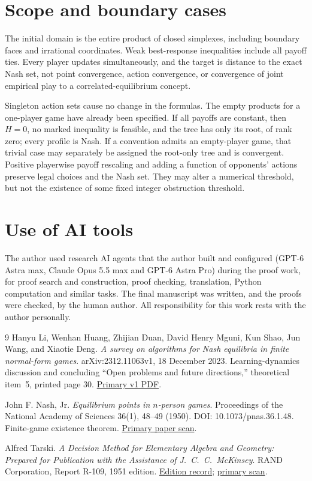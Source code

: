 \documentclass[11pt,a4paper]{article}
\theoremstyle{definition}
\begin{document}
\section{Scope and boundary cases}

The initial domain is the entire product of closed simplexes, including
boundary faces and irrational coordinates. Weak best-response inequalities
include all payoff ties. Every player updates simultaneously, and the
target is distance to the exact Nash set, not point convergence, action
convergence, or convergence of joint empirical play to a
correlated-equilibrium concept.

Singleton action sets cause no change in the formulas. The empty products
for a one-player game have already been specified. If all payoffs are
constant, then $H=0$, no marked inequality is feasible, and the tree has
only its root, of rank zero; every profile is Nash. If a convention admits
an empty-player game, that trivial case may separately be assigned the
root-only tree and is convergent. Positive playerwise payoff rescaling and
adding a function of opponents' actions preserve legal choices and the
Nash set. They may alter a numerical threshold, but not the existence of
some fixed integer obstruction threshold.

\section*{Use of AI tools}
The author used research AI agents that the author built and configured (GPT-6 Astra max,
Claude Opus 5.5 max and GPT-6 Astra Pro) during the proof work, for proof search and
construction, proof checking, translation, Python computation and similar tasks. The final
manuscript was written, and the proofs were checked, by the human author. All responsibility
for this work rests with the author personally.

\begin{thebibliography}{9}
Hanyu Li, Wenhan Huang, Zhijian Duan, David Henry Mguni, Kun Shao,
Jun Wang, and Xiaotie Deng.
\emph{A survey on algorithms for Nash equilibria in finite normal-form
games}. arXiv:2312.11063v1, 18 December 2023.
Learning-dynamics discussion and concluding ``Open problems and future
directions,'' theoretical item~5, printed page 30.
\href{https://arxiv.org/pdf/2312.11063v1}{Primary v1 PDF}.

John F. Nash, Jr.
\emph{Equilibrium points in $n$-person games}.
Proceedings of the National Academy of Sciences 36(1), 48--49 (1950).
DOI: 10.1073/pnas.36.1.48. Finite-game existence theorem.
\href{https://pmc.ncbi.nlm.nih.gov/articles/PMC1063129/}{Primary paper scan}.

Alfred Tarski.
\emph{A Decision Method for Elementary Algebra and Geometry:
Prepared for Publication with the Assistance of J.~C.~C.~McKinsey}.
RAND Corporation, Report R-109, 1951 edition.
\href{https://www.rand.org/pubs/reports/R109.html}{Edition record}; \href{https://www.rand.org/content/dam/rand/pubs/reports/2008/R109.pdf}{primary scan}.
\end{thebibliography}
\end{document}
